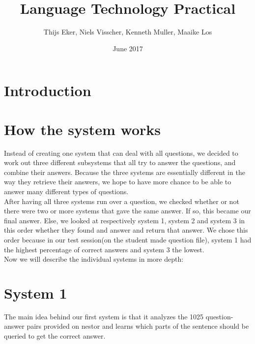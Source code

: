 \documentclass{article}
\title{Language Technology Practical}
\author{Thijs Eker, Niels Visscher, Kenneth Muller, Maaike Los }
\date{June 2017}
\begin{document}
\maketitle

\section{Introduction}



\section{How the system works}
Instead of creating one system that can deal with all questions, we decided to work out three different subsystems that all try to answer the questions, and combine their answers. Because the three systems are essentially different in the way they retrieve their answers, we hope to have more chance to be able to answer many different types of questions. \\
After having all three systems run over a question, we checked whether or not there were two or more systems that gave the same answer. If so, this became our final answer. Else, we looked at respectively system 1, system 2 and system 3 in this order whether they found and answer and return that answer. We chose this order because in our test session(on the student made question file), system 1 had the highest percentage of correct answers and system 3 the lowest.\\
Now we will describe the individual systems in more depth:

\section*{System 1}
The main idea behind our first system is that it analyzes the 1025 question-answer pairs provided on nestor and learns which parts of the sentence should be queried to get the correct answer.
\end{document}
